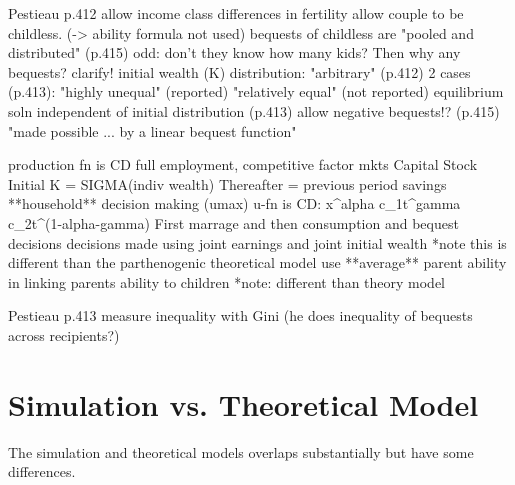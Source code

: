 \documentclass{article}
\begin{document}
\begin{verbatimtab}[4]
Pestieau p.412
	allow income class differences in fertility
	allow couple to be childless. (-> ability formula not used)
		bequests of childless are "pooled and distributed" (p.415)
		odd: don't they know how many kids? Then why any bequests? clarify!
	initial wealth (K) distribution:
		"arbitrary" (p.412)
		2 cases (p.413):
			"highly unequal" (reported)
			"relatively equal" (not reported)
			equilibrium soln independent of initial distribution (p.413)
	allow negative bequests!? (p.415)
		"made possible ... by a linear bequest function"
			
	production fn is CD
	full employment, competitive factor mkts
	Capital Stock
		Initial K = SIGMA(indiv wealth)
		Thereafter = previous period savings
	**household** decision making (umax)
		u-fn is CD: x^alpha c_{1}t^gamma c_{2}t^(1-alpha-gamma)
	First marrage and then consumption and bequest decisions
		decisions made using joint earnings and joint initial wealth
			*note this is different than the parthenogenic theoretical model
	use **average** parent ability in linking parents ability to children
		*note: different than theory model
	
Pestieau p.413
	measure inequality with Gini (he does inequality of bequests across recipients?)

\end{verbatimtab}

\section{Simulation vs. Theoretical Model}

The simulation and theoretical models overlaps substantially but have some differences.
\end{document}
